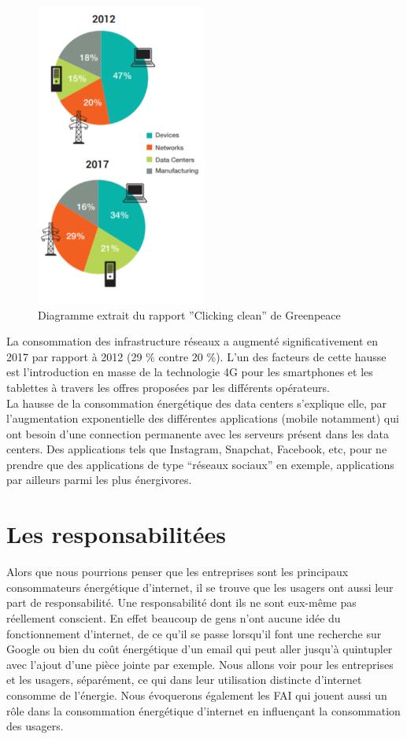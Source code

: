 \documentclass[a4paper,twocolumn,12pt]{article}
\begin{document}
\begin{figure}[!h]	
\centerline{\includegraphics[height=10cm]{picture/diagCamenbert.png}}
\caption{Diagramme extrait du rapport ''Clicking clean'' de Greenpeace}
\label{diagCamenbert}
\end{figure}	

	La consommation des infrastructure réseaux a augmenté significativement  en 2017 par rapport à 2012 (29 \% contre 20 \%). L’un des facteurs de cette hausse est l’introduction en masse de la technologie 4G pour les smartphones et les tablettes à travers les offres proposées par les différents opérateurs. \\

	La hausse de la consommation énergétique des data centers s’explique elle, par l’augmentation exponentielle des différentes applications (mobile notamment) qui ont besoin d’une connection permanente avec les serveurs présent dans les data centers. Des applications tels que Instagram, Snapchat, Facebook, etc, pour ne prendre que des applications de type “réseaux sociaux” en exemple, applications par ailleurs parmi les plus énergivores.
	
\section{Les responsabilitées}

	Alors que nous pourrions penser que les entreprises sont les principaux consommateurs énergétique d’internet, il se trouve que les usagers ont aussi leur part de responsabilité. Une responsabilité dont ils ne sont eux-même pas réellement conscient. En effet beaucoup de gens n’ont aucune idée du fonctionnement d’internet, de ce qu’il se passe lorsqu’il font une recherche sur Google ou bien du coût énergétique d’un email qui peut aller jusqu’à quintupler avec l’ajout d’une pièce jointe par exemple. Nous allons voir pour les entreprises et les usagers, séparément, ce qui dans leur utilisation distincte d’internet consomme de l’énergie. Nous évoquerons également les FAI qui jouent aussi un rôle dans la consommation énergétique d’internet en influençant la consommation des usagers.  
	
\end{document}
